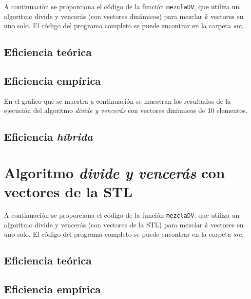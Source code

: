 \documentclass[11pt]{article}
\begin{document}
A continuación se proporciona el código de la función \texttt{mezclaDV},
que utiliza un algoritmo divide y vencerás (con vectores dinámicos) para mezclar $k$ vectores en uno solo. El
código del programa completo se puede encontrar en la carpeta \textit{src}.



\subsection*{Eficiencia teórica}

\subsection*{Eficiencia empírica}

En el gráfico que se muestra a continuación se muestran los resultados de la
ejecución del algoritmo \textit{divide y vencerás} con vectores dinámicos de 10 elementos.

\begin{center}
	
\end{center}

\subsection*{Eficiencia \textit{híbrida}}

\section*{Algoritmo \textit{divide y vencerás} con vectores de la STL}


A continuación se proporciona el código de la función \texttt{mezclaDV},
que utiliza un algoritmo divide y vencerás (con vectores de la STL) para mezclar $k$ vectores en uno solo. El
código del programa completo se puede encontrar en la carpeta \textit{src}.



\subsection*{Eficiencia teórica}

\subsection*{Eficiencia empírica}
\end{document}
